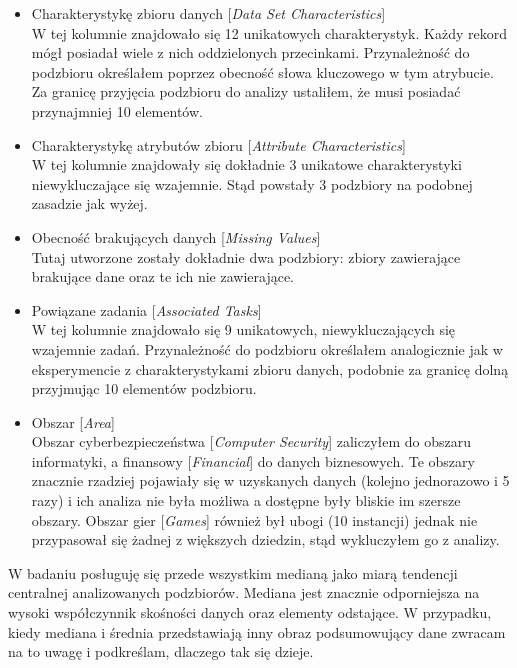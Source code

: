 \begin{itemize}
  \item Charakterystykę zbioru danych [\emph{Data Set Characteristics}] \\
        W tej kolumnie znajdowało się 12 unikatowych charakterystyk.
        Każdy rekord mógł posiadał wiele z nich oddzielonych przecinkami.
        Przynależność do podzbioru określałem poprzez obecność słowa kluczowego w tym atrybucie.
        Za granicę przyjęcia podzbioru do analizy ustaliłem, że musi posiadać przynajmniej 10 elementów.

  \item Charakterystykę atrybutów zbioru [\emph{Attribute Characteristics}] \\
        W tej kolumnie znajdowały się dokładnie 3 unikatowe charakterystyki niewykluczające się wzajemnie.
        Stąd powstały 3 podzbiory na podobnej zasadzie jak wyżej.

  \item Obecność brakujących danych [\emph{Missing Values}] \\
        Tutaj utworzone zostały dokładnie dwa podzbiory: zbiory zawierające brakujące dane oraz te ich nie zawierające.

  \item Powiązane zadania [\emph{Associated Tasks}] \\
        W tej kolumnie znajdowało się 9 unikatowych, niewykluczających się wzajemnie zadań.
        Przynależność do podzbioru określałem analogicznie jak w eksperymencie z charakterystykami zbioru danych, podobnie za granicę dolną przyjmując 10 elementów podzbioru.

  \item Obszar [\emph{Area}] \\
        Obszar cyberbezpieczeństwa [\emph{Computer Security}] zaliczyłem do obszaru informatyki, a finansowy [\emph{Financial}] do danych biznesowych.
        Te obszary znacznie rzadziej pojawiały się w uzyskanych danych (kolejno jednorazowo i 5 razy) i ich analiza nie była możliwa a dostępne były bliskie im szersze obszary.
        Obszar gier [\emph{Games}] również był ubogi (10 instancji) jednak nie przypasował się żadnej z większych dziedzin, stąd wykluczyłem go z analizy.

\end{itemize}

W badaniu posługuję się przede wszystkim medianą jako miarą tendencji centralnej analizowanych podzbiorów.
Mediana jest znacznie odporniejsza na wysoki współczynnik skośności danych oraz elementy odstające.
W przypadku, kiedy mediana i średnia przedstawiają inny obraz podsumowujący dane zwracam na to uwagę i podkreślam, dlaczego tak się dzieje.


